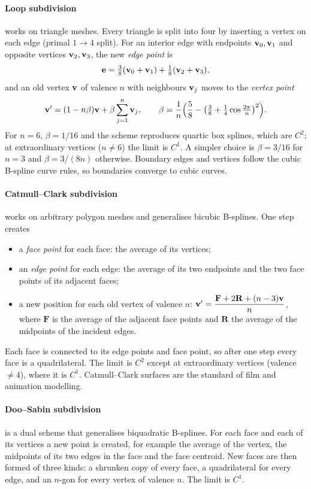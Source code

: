 \paragraph{Loop subdivision} \citep{Loop1987} works on triangle meshes. Every triangle is split into
four by inserting a vertex on each edge (primal $1\to4$ split). For an interior edge with endpoints
$\mathbf{v}_0,\mathbf{v}_1$ and opposite vertices $\mathbf{v}_2,\mathbf{v}_3$, the new \emph{edge point} is
\begin{equation}
\mathbf{e}=\tfrac38(\mathbf{v}_0+\mathbf{v}_1)+\tfrac18(\mathbf{v}_2+\mathbf{v}_3),
\end{equation}
and an old vertex $\mathbf{v}$ of valence $n$ with neighbours $\mathbf{v}_j$ moves to the \emph{vertex point}
\begin{equation}
\mathbf{v}'=(1-n\beta)\mathbf{v}+\beta\sum_{j=1}^n\mathbf{v}_j,\qquad
\beta=\frac1n\Bigl(\frac58-\bigl(\tfrac38+\tfrac14\cos\tfrac{2\pi}{n}\bigr)^2\Bigr) .
\end{equation}
For $n=6$, $\beta=1/16$ and the scheme reproduces quartic box splines, which are $C^2$; at
extraordinary vertices ($n\neq6$) the limit is $C^1$. A simpler choice is $\beta=3/16$ for $n=3$ and
$\beta=3/(8n)$ otherwise. Boundary edges and vertices follow the cubic B-spline curve rules, so
boundaries converge to cubic curves.

\paragraph{Catmull--Clark subdivision} \citep{Catmull1978} works on arbitrary polygon meshes and
generalises bicubic B-splines. One step creates
\begin{itemize}
  \item a \emph{face point} for each face: the average of its vertices;
  \item an \emph{edge point} for each edge: the average of its two endpoints and the two face points
  of its adjacent faces;
  \item a new position for each old vertex of valence $n$:
  $\mathbf{v}'=\dfrac{\mathbf F+2\mathbf R+(n-3)\mathbf{v}}{n}$, where $\mathbf F$ is the average of the adjacent
  face points and $\mathbf R$ the average of the midpoints of the incident edges.
\end{itemize}
Each face is connected to its edge points and face point, so after one step every face is a
quadrilateral. The limit is $C^2$ except at extraordinary vertices (valence $\neq4$), where it is
$C^1$. Catmull--Clark surfaces are the standard of film and animation modelling.

\paragraph{Doo--Sabin subdivision} \citep{Doo1978} is a dual scheme that generalises biquadratic
B-splines. For each face and each of its vertices a new point is created, for example the average
of the vertex, the midpoints of its two edges in the face and the face centroid. New faces are then
formed of three kinds: a shrunken copy of every face, a quadrilateral for every edge, and an
$n$-gon for every vertex of valence $n$. The limit is $C^1$.

